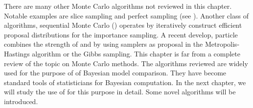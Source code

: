 There are many other Monte Carlo algorithms not reviewed in this chapter.
Notable examples are slice sampling and perfect sampling (see \cite[][chap.~8
and~13]{Robert:2004tn}). Another class of algorithms, sequential Monte Carlo
(\smc) operates by iteratively construct efficient proposal distributions for
the importance sampling. A recent develop, particle \mcmc
\cite{Andrieu:2010gc} combines the strength of \mcmc and \smc by using \smc
samplers as proposal in the Metropolis-Hastings algorithm or the Gibbs
sampling. This chapter is far from a complete review of the topic on Monte
Carlo methods. The algorithms reviewed are widely used for the purpose of of
Bayesian model comparison. They have become standard tools of statisticians
for Bayesian computation. In the next chapter, we will study the use of \smc
for this purpose in detail. Some novel algorithms will be introduced.
